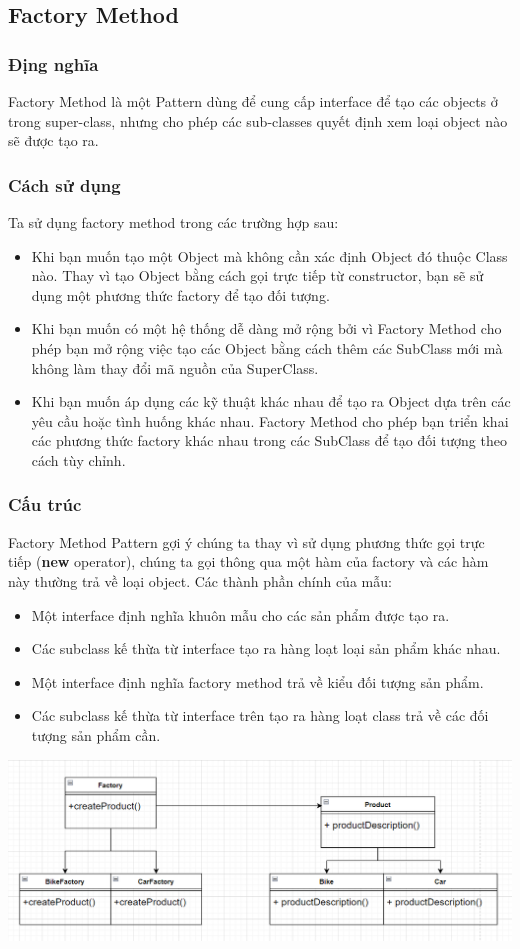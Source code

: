 \subsection{Factory Method}
\subsubsection{Địng nghĩa}
Factory Method là một Pattern dùng để cung cấp interface để tạo các objects ở trong super-class, nhưng cho phép các sub-classes quyết định xem loại object nào sẽ được tạo ra.
\subsubsection{Cách sử dụng}
Ta sử dụng factory method trong các trường hợp sau:
\begin{itemize}
    \item Khi bạn muốn tạo một Object mà không cần xác định Object đó thuộc Class nào. Thay vì tạo Object bằng cách gọi trực tiếp từ constructor, bạn sẽ sử dụng một phương thức factory để tạo đối tượng.
    \item Khi bạn muốn có một hệ thống dễ dàng mở rộng bởi vì Factory Method cho phép bạn mở rộng việc tạo các Object bằng cách thêm các SubClass mới mà không làm thay đổi mã nguồn của SuperClass.
    \item Khi bạn muốn áp dụng các kỹ thuật khác nhau để tạo ra Object dựa trên các yêu cầu hoặc tình huống khác nhau. Factory Method cho phép bạn triển khai các phương thức factory khác nhau trong các SubClass để tạo đối tượng theo cách tùy chỉnh.
\end{itemize}
\subsubsection{Cấu trúc}
Factory Method Pattern gợi ý chúng ta thay vì sử dụng phương thức gọi trực tiếp (\textbf{new} operator), chúng ta gọi thông qua một hàm của factory và các hàm này thường trả về loại object. Các thành phần chính của mẫu: \\
\begin{itemize}
    \item Một interface định nghĩa khuôn mẫu cho các sản phẩm được tạo ra.
    \item Các subclass kế thừa từ interface tạo ra hàng loạt loại sản phẩm khác nhau.
    \item Một interface định nghĩa factory method trả về kiểu đối tượng sản phẩm.
    \item Các subclass kế thừa từ interface trên tạo ra hàng loạt class trả về các đối tượng sản phẩm cần.
\end{itemize}
\includegraphics[scale=0.65]{image/creational/cso.png}
